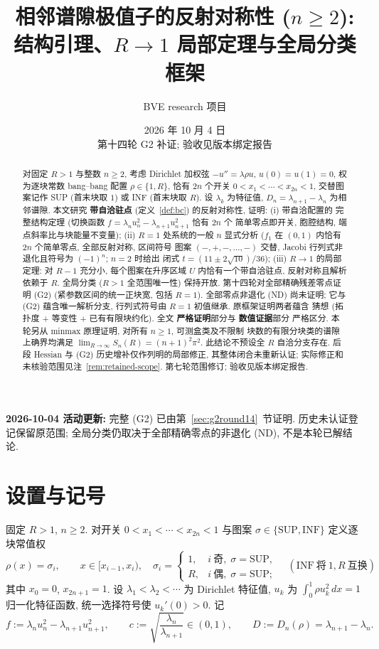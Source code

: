 \documentclass[UTF8]{ctexart}
\title{相邻谱隙极值子的反射对称性 ($n\ge2$):\\ 结构引理、$R\to1$ 局部定理与全局分类框架}
\author{BVE research 项目}
\date{2026 年 10 月 4 日\\第十四轮 G2 补证; 验收见版本绑定报告}
\newcommand{\STRICT}{\textbf{严格证明}}
\newcommand{\EVIDENCE}{\textbf{数值证据}}
\begin{document}
\maketitle

\begin{abstract}
对固定 $R>1$ 与整数 $n\ge2$, 考虑 Dirichlet 加权弦 $-u''=\lambda\rho u$,
$u(0)=u(1)=0$, 权为逐块常数 bang--bang 配置 $\rho\in\{1,R\}$, 恰有 $2n$ 个开关
$0<x_1<\cdots<x_{2n}<1$, 交替图案记作 SUP (首末块取 $1$) 或 INF (首末块取 $R$).
设 $\lambda_k$ 为特征值, $D_n=\lambda_{n+1}-\lambda_n$ 为相邻谱隙. 本文研究
\textbf{带自洽驻点} (定义~\ref{def:bc}) 的反射对称性, 证明: (i) 带自洽配置的
完整结构定理 (切换函数 $f=\lambda_nu_n^2-\lambda_{n+1}u_{n+1}^2$ 恰有 $2n$ 个
简单零点即开关, 胞腔结构, 端点斜率比与块能量不变量); (ii) $R=1$ 处系统的一般
$n$ 显式分析 ($f_1$ 在 $(0,1)$ 内恰有 $2n$ 个简单零点, 全部反射对称, 区间符号
图案 $(-,+,-,\dots,-)$ 交替, Jacobi 行列式非退化且符号为 $(-1)^n$; $n=2$ 时给出
闭式 $t=(11\pm2\sqrt{10})/36$); (iii) $R\to1$ 的局部定理: 对 $R-1$ 充分小,
每个图案在升序区域 $U$ 内恰有一个带自洽驻点, 反射对称且解析依赖于 $R$.
全局分类 ($R>1$ 全范围唯一性) 保持开放. 第十四轮对全部精确残差零点证明
(G2) (紧参数区间的统一正块宽, 包括 $R=1$). 全部零点非退化 (ND) 尚未证明;
它与 (G2) 蕴含唯一解析分支, 行列式符号由 $R=1$ 初值继承. 原框架证明两者蕴含
猜想 (拓扑度 + 等变性 + 已有有限块约化). 全文 \STRICT 部分与 \EVIDENCE 部分
严格区分. 本轮另从 minmax 原理证明, 对所有 $n\ge1$, 可测盒类及不限制
块数的有限分块类的谱隙上确界均满足
$\lim_{R\to\infty}S_n(R)=(n+1)^2\pi^2$. 此结论不预设全 $R$ 自洽分支存在.
后段 Hessian 与 (G2) 历史增补仅作列明的局部修正, 其整体闭合未重新认证;
实际修正和未核验范围见注~\ref{rem:retained-scope}.
第七轮范围修订; 验收见版本绑定报告.
\end{abstract}

\noindent\textbf{2026-10-04 活动更新:} 完整 (G2) 已由第~\ref{sec:g2round14}~节证明. 历史未认证登记保留原范围; 全局分类仍取决于全部精确零点的非退化 (ND), 不是本轮已解结论.

\section{设置与记号}\label{sec:setup}

固定 $R>1$, $n\ge2$. 对开关 $0<x_1<\cdots<x_{2n}<1$ 与图案
$\sigma\in\{\mathrm{SUP},\mathrm{INF}\}$ 定义逐块常值权
\begin{equation*}
	\rho(x)=\sigma_i,\qquad x\in[x_{i-1},x_i),\quad
	\sigma_i=\begin{cases}1,& i\ \text{奇},\; \sigma=\mathrm{SUP},\\
	R,& i\ \text{偶},\; \sigma=\mathrm{SUP};\end{cases}
	\quad
	(\mathrm{INF}\ \text{将}\ 1,R\ \text{互换})
\end{equation*}
其中 $x_0=0$, $x_{2n+1}=1$. 设 $\lambda_1<\lambda_2<\cdots$ 为 Dirichlet 特征值,
$u_k$ 为 $\int_0^1\rho u_k^2\,dx=1$ 归一化特征函数, 统一选择符号使
$u_k'(0)>0$. 记
\begin{equation*}
	f:=\lambda_n u_n^2-\lambda_{n+1}u_{n+1}^2,\qquad
	c:=\sqrt{\frac{\lambda_n}{\lambda_{n+1}}}\in(0,1),\qquad
	D:=D_n(\rho)=\lambda_{n+1}-\lambda_n.
\end{equation*}
\end{document}
